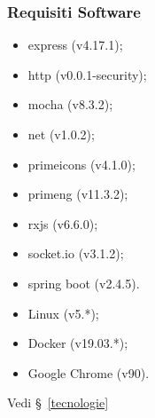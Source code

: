 \subsubsection{Requisiti Software}
	\begin{itemize}
		\item express (v4.17.1);
		\item http (v0.0.1-security);
		\item mocha (v8.3.2);
		\item net (v1.0.2);
		\item primeicons (v4.1.0);
		\item primeng (v11.3.2);
		\item rxjs (v6.6.0);
		\item socket.io (v3.1.2);
		\item spring boot (v2.4.5).
	\end{itemize}
    \begin{itemize}
    		\item Linux (v5.*);
        \item Docker (v19.03.*);
        \item Google Chrome (v90).
    \end{itemize}

    Vedi \S\ \ref{tecnologie}

    \begin{comment}
    	\item Client:
    \begin{itemize}
    	\item Docker.

    \end{itemize}
    	\item Server:
    \begin{itemize}
    	\item Docker.

    \end{itemize}
    \end{comment}








